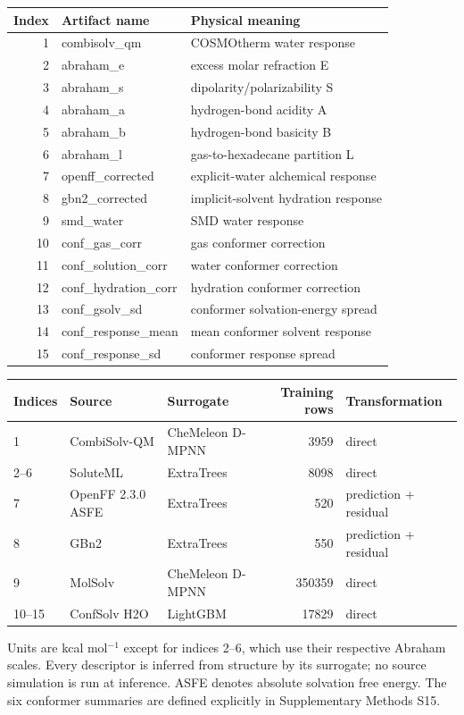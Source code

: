 \noindent\begin{tabularx}{\textwidth}{@{}rlX@{}}
\toprule
Index & Artifact name & Physical meaning \\
\midrule
1 & combisolv\_qm & COSMOtherm water response \\
2 & abraham\_e & excess molar refraction E \\
3 & abraham\_s & dipolarity/polarizability S \\
4 & abraham\_a & hydrogen-bond acidity A \\
5 & abraham\_b & hydrogen-bond basicity B \\
6 & abraham\_l & gas-to-hexadecane partition L \\
7 & openff\_corrected & explicit-water alchemical response \\
8 & gbn2\_corrected & implicit-solvent hydration response \\
9 & smd\_water & SMD water response \\
10 & conf\_gas\_corr & gas conformer correction \\
11 & conf\_solution\_corr & water conformer correction \\
12 & conf\_hydration\_corr & hydration conformer correction \\
13 & conf\_gsolv\_sd & conformer solvation-energy spread \\
14 & conf\_response\_mean & mean conformer solvent response \\
15 & conf\_response\_sd & conformer response spread \\
\bottomrule\end{tabularx}
\par\medskip
\noindent\begin{tabularx}{\textwidth}{@{}lp{3cm}Xrp{3cm}@{}}
\toprule
Indices & Source & Surrogate & Training rows & Transformation \\
\midrule
1 & CombiSolv-QM & CheMeleon D-MPNN & 3959 & direct \\
2--6 & SoluteML & ExtraTrees & 8098 & direct \\
7 & OpenFF 2.3.0 ASFE & ExtraTrees & 520 & prediction + residual \\
8 & GBn2 & ExtraTrees & 550 & prediction + residual \\
9 & MolSolv & CheMeleon D-MPNN & 350359 & direct \\
10--15 & ConfSolv H2O & LightGBM & 17829 & direct \\
\bottomrule\end{tabularx}
\par\smallskip
Units are kcal mol$^{-1}$ except for indices 2--6, which use their respective Abraham scales.
Every descriptor is inferred from structure by its surrogate; no source simulation is run at inference.
ASFE denotes absolute solvation free energy. The six conformer summaries are defined explicitly in Supplementary Methods S15.
